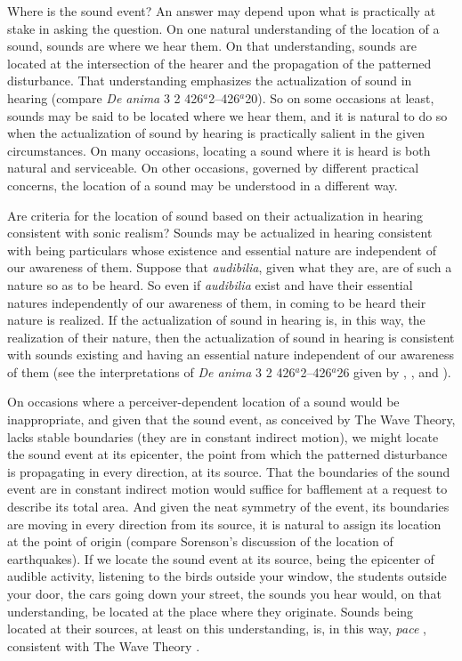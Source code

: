Where is the sound event? An answer may depend upon what is practically at stake in asking the question. On one natural understanding of the location of a sound, sounds are where we hear them. On that understanding, sounds are located at the intersection of the hearer and the propagation of the patterned disturbance. That understanding emphasizes the actualization of sound in hearing (compare \emph{De anima} 3 2 426\( ^{a} \)2--426\( ^{a} \)20). So on some occasions at least, sounds may be said to be located where we hear them, and it is natural to do so when the actualization of sound by hearing is practically salient in the given circumstances. On many occasions, locating a sound where it is heard is both natural and serviceable. On other occasions, governed by different practical concerns, the location of a sound may be understood in a different way. 

Are criteria for the location of sound based on their actualization in hearing consistent with sonic realism? Sounds may be actualized in hearing consistent with being particulars whose existence and essential nature are independent of our awareness of them. Suppose that \emph{audibilia}, given what they are, are of such a nature so as to be heard. So even if \emph{audibilia} exist and have their essential natures independently of our awareness of them, in coming to be heard their nature is realized. If the actualization of sound in hearing is, in this way, the realization of their nature, then the actualization of sound in hearing is consistent with sounds existing and having an essential nature independent of our awareness of them (see the interpretations of \emph{De anima} 3 2 426\( ^{a} \)2--426\( ^{a} \)26 given by \citealt[29]{Burnyeat:1982mz}, \citealt{Ganson:1997fk}, and \citealt[84--88]{Kalderon:2015fr}). 

On occasions where a perceiver-dependent location of a sound would be inappropriate, and given that the sound event, as conceived by The Wave Theory, lacks stable boundaries (they are in constant indirect motion), we might locate the sound event at its epicenter, the point from which the patterned disturbance is propagating in every direction, at its source. That the boundaries of the sound event are in constant indirect motion would suffice for bafflement at a request to describe its total area. And given the neat symmetry of the event, its boundaries are moving in every direction from its source, it is natural to assign its location at the point of origin (compare Sorenson's \citeyear[138--9]{Sorensen:2009aa} discussion of the location of earthquakes). If we locate the sound event at its source, being the epicenter of audible activity, listening to the birds outside your window, the students outside your door, the cars going down your street, the sounds you hear would, on that understanding, be located at the place where they originate. Sounds being located at their sources, at least on this understanding, is, in this way, \emph{pace} \citet{Pasnau:1999ss}, consistent with The Wave Theory \citep[see][123, for a partial anticipation of this point]{OShaughnessy:2009aa}.

